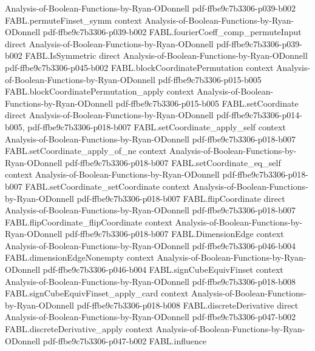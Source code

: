 \begin{theorem}
  {Analysis-of-Boolean-Functions-by-Ryan-ODonnell}
  {pdf-ffbe9c7b3306-p039-b002}
\proofstep
  {FABL.permuteFinset_symm}
  {context}
  {Analysis-of-Boolean-Functions-by-Ryan-ODonnell}
  {pdf-ffbe9c7b3306-p039-b002}
\proofstep
  {FABL.fourierCoeff_comp_permuteInput}
  {direct}
  {Analysis-of-Boolean-Functions-by-Ryan-ODonnell}
  {pdf-ffbe9c7b3306-p039-b002}
\proofstep
  {FABL.IsSymmetric}
  {direct}
  {Analysis-of-Boolean-Functions-by-Ryan-ODonnell}
  {pdf-ffbe9c7b3306-p045-b002}
\proofstep
  {FABL.blockCoordinatePermutation}
  {context}
  {Analysis-of-Boolean-Functions-by-Ryan-ODonnell}
  {pdf-ffbe9c7b3306-p015-b005}
\proofstep
  {FABL.blockCoordinatePermutation_apply}
  {context}
  {Analysis-of-Boolean-Functions-by-Ryan-ODonnell}
  {pdf-ffbe9c7b3306-p015-b005}
\proofstep
  {FABL.setCoordinate}
  {direct}
  {Analysis-of-Boolean-Functions-by-Ryan-ODonnell}
  {pdf-ffbe9c7b3306-p014-b005,
    pdf-ffbe9c7b3306-p018-b007}
\proofstep
  {FABL.setCoordinate_apply_self}
  {context}
  {Analysis-of-Boolean-Functions-by-Ryan-ODonnell}
  {pdf-ffbe9c7b3306-p018-b007}
\proofstep
  {FABL.setCoordinate_apply_of_ne}
  {context}
  {Analysis-of-Boolean-Functions-by-Ryan-ODonnell}
  {pdf-ffbe9c7b3306-p018-b007}
\proofstep
  {FABL.setCoordinate_eq_self}
  {context}
  {Analysis-of-Boolean-Functions-by-Ryan-ODonnell}
  {pdf-ffbe9c7b3306-p018-b007}
\proofstep
  {FABL.setCoordinate_setCoordinate}
  {context}
  {Analysis-of-Boolean-Functions-by-Ryan-ODonnell}
  {pdf-ffbe9c7b3306-p018-b007}
\proofstep
  {FABL.flipCoordinate}
  {direct}
  {Analysis-of-Boolean-Functions-by-Ryan-ODonnell}
  {pdf-ffbe9c7b3306-p018-b007}
\proofstep
  {FABL.flipCoordinate_flipCoordinate}
  {context}
  {Analysis-of-Boolean-Functions-by-Ryan-ODonnell}
  {pdf-ffbe9c7b3306-p018-b007}
\proofstep
  {FABL.DimensionEdge}
  {context}
  {Analysis-of-Boolean-Functions-by-Ryan-ODonnell}
  {pdf-ffbe9c7b3306-p046-b004}
\proofstep
  {FABL.dimensionEdgeNonempty}
  {context}
  {Analysis-of-Boolean-Functions-by-Ryan-ODonnell}
  {pdf-ffbe9c7b3306-p046-b004}
\proofstep
  {FABL.signCubeEquivFinset}
  {context}
  {Analysis-of-Boolean-Functions-by-Ryan-ODonnell}
  {pdf-ffbe9c7b3306-p018-b008}
\proofstep
  {FABL.signCubeEquivFinset_apply_card}
  {context}
  {Analysis-of-Boolean-Functions-by-Ryan-ODonnell}
  {pdf-ffbe9c7b3306-p018-b008}
\proofstep
  {FABL.discreteDerivative}
  {direct}
  {Analysis-of-Boolean-Functions-by-Ryan-ODonnell}
  {pdf-ffbe9c7b3306-p047-b002}
\proofstep
  {FABL.discreteDerivative_apply}
  {context}
  {Analysis-of-Boolean-Functions-by-Ryan-ODonnell}
  {pdf-ffbe9c7b3306-p047-b002}
\proofstep
  {FABL.influence}

\end{theorem}
